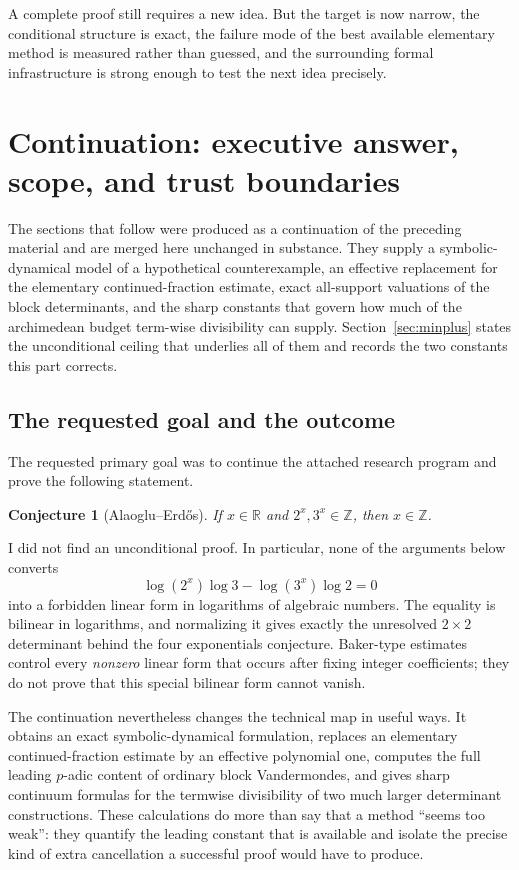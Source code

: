 \documentclass[11pt,oneside]{article}
\newtheorem{conjecture}[theorem]{Conjecture}
\theoremstyle{definition}
\theoremstyle{remark}
\newcommand{\Z}{\mathbb Z}
\newcommand{\R}{\mathbb R}
\begin{document}
A complete proof still requires a new idea.  But the target is now narrow, the conditional
structure is exact, the failure mode of the best available elementary method is measured
rather than guessed, and the surrounding formal infrastructure is strong enough to test the
next idea precisely.
\clearpage

\section{Continuation: executive answer, scope, and trust boundaries}
\label{sec:continuation}

The sections that follow were produced as a continuation of the preceding material and
are merged here unchanged in substance.  They supply a symbolic-dynamical model of a
hypothetical counterexample, an effective replacement for the elementary
continued-fraction estimate, exact all-support valuations of the block determinants, and
the sharp constants that govern how much of the archimedean budget term-wise divisibility
can supply.  Section~\ref{sec:minplus} states the unconditional ceiling that
underlies all of them and records the two constants this part corrects.


\subsection{The requested goal and the outcome}

The requested primary goal was to continue the attached research program and prove the
following statement.

\begin{conjecture}[Alaoglu--Erd\H{o}s]
If $x\in\R$ and $2^x,3^x\in\Z$, then $x\in\Z$.
\end{conjecture}

I did not find an unconditional proof.  In particular, none of the arguments below converts
\[
  \log(2^x)\log3-\log(3^x)\log2=0
\]
into a forbidden linear form in logarithms of algebraic numbers.  The equality is bilinear in
logarithms, and normalizing it gives exactly the unresolved $2\times2$ determinant behind the
four exponentials conjecture.  Baker-type estimates control every \emph{nonzero} linear form
that occurs after fixing integer coefficients; they do not prove that this special bilinear
form cannot vanish.

The continuation nevertheless changes the technical map in useful ways.  It obtains an exact
symbolic-dynamical formulation, replaces an elementary continued-fraction estimate by an
effective polynomial one, computes the full leading $p$-adic content of ordinary block
Vandermondes, and gives sharp continuum formulas for the termwise divisibility of two much
larger determinant constructions.  These calculations do more than say that a method ``seems
too weak'': they quantify the leading constant that is available and isolate the precise
kind of extra cancellation a successful proof would have to produce.
\end{document}
